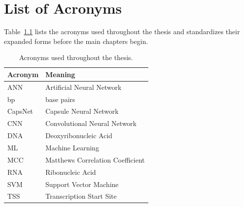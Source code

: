 \chapter{List of Acronyms}

Table~\ref{tab:frontmatter-acronyms} lists the acronyms used throughout the thesis and standardizes their expanded forms before the main chapters begin.

\begin{table}[H]
\centering
\caption{Acronyms used throughout the thesis.}
\label{tab:frontmatter-acronyms}
\begin{tabular}{ll}
\toprule
Acronym & Meaning \\
\midrule
ANN & Artificial Neural Network \\
bp & base pairs \\
CapsNet & Capsule Neural Network \\
CNN & Convolutional Neural Network \\
DNA & Deoxyribonucleic Acid \\
ML & Machine Learning \\
MCC & Matthews Correlation Coefficient \\
RNA & Ribonucleic Acid \\
SVM & Support Vector Machine \\
TSS & Transcription Start Site \\
\bottomrule
\end{tabular}
\end{table}
